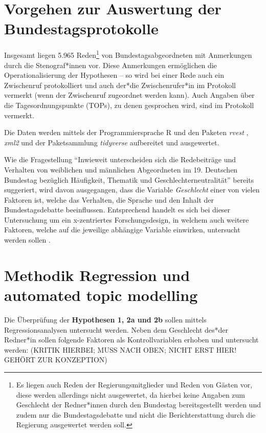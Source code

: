 \documentclass[12pt, 
    twoside=false, 
    bibliography=totoc, 
    numbers=endperiod, 
    headings=normal, 
    toc=chapterentrydotfill
    ]{scrbook}
\begin{document}
\section{Vorgehen zur Auswertung der Bundestagsprotokolle}


Insgesamt liegen 5.965 Reden\footnote{Es liegen auch Reden der Regierungsmitglieder und Reden von Gästen vor, diese werden allerdings nicht ausgewertet, da hierbei keine Angaben zum Geschlecht der Redner*innen durch den Bundestag bereitsgestellt werden und zudem nur die Bundestagsdebatte und nicht die Berichterstattung durch die Regierung ausgewertet werden soll.} von Bundestagsabgeordneten mit Anmerkungen durch die Stenograf*innen vor. Diese Anmerkungen ermöglichen die Operationalisierung der Hypothesen -- so wird bei einer Rede auch ein Zwischenruf protokolliert und auch der*die Zwischenrufer*in im Protokoll vermerkt (wenn der Zwischenruf zugeordnet werden kann). Auch Angaben über die Tagesordnungspunkte (TOPs), zu denen gesprochen wird, sind im Protokoll vermerkt.

Die Daten werden mittels der Programmiersprache R \parencite{rcoreteam_2018} und den Paketen \emph{rvest} \parencite{wickham_2016}, \emph{xml2} \parencite{wickham_2018} und der Paketsammlung \emph{tidyverse} \parencite{wickham_2017} aufbereitet und ausgewertet.


Wie die Fragestellung \enquote{Inwieweit unterscheiden sich die Redebeiträge und Verhalten von weiblichen und männlichen
Abgeordneten im 19. Deutschen Bundestag bezüglich Häufigkeit, Thematik und Geschlechterneutralität} bereits suggeriert, wird davon ausgegangen, dass die Variable \emph{Geschlecht} einer von vielen Faktoren ist, welche das Verhalten, die Sprache und den Inhalt der Bundestagsdebatte beeinflussen. Entsprechend handelt es sich bei dieser Untersuchung um ein x-zentriertes Forschungsdesign, in welchem auch weitere Faktoren, welche auf die jeweilige abhängige Variable einwirken, untersucht werden sollen  \parencites[vgl.][3f.]{ganghof_2005}.

\section{Methodik Regression und automated topic modelling}


Die Überprüfung der \textbf{Hypothesen 1, 2a und 2b} sollen mittels Regressionsanalysen untersucht werden. Neben dem Geschlecht des*der Redner*in sollen folgende Faktoren als Kontrollvariablen erhoben und untersucht werden: (KRITIK HIERBEI; MUSS NACH OBEN; NICHT ERST HIER! GEHÖRT ZUR KONZEPTION)
\end{document}
